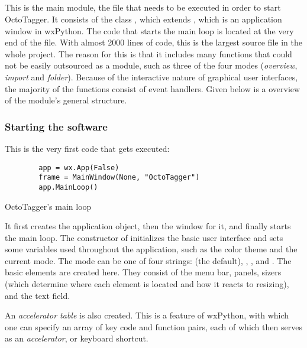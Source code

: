 \subsection{}
\def\kapitelautor{Erik Ritschl}

This is the main module, the file that needs to be executed in order to start OctoTagger. It consists of the class , which extends
, which is an application window in wxPython.
The code that starts the main loop is located at the very end of the file. %
With almost 2000 lines of code, this is the largest source file in the whole
project. The reason for this is that it includes many functions that could not
be easily outsourced as a module, such as three of the four modes (\emph{overview}, \emph{import} and \emph{folder}). Because of the interactive nature of graphical user interfaces, the majority of the  functions consist of event handlers. Given below is a overview of the
module's general structure.

\subsubsection{Starting the software}

This is the very first code that gets executed:

\begin{listing}[H]
    \begin{verbatim}
        app = wx.App(False)
        frame = MainWindow(None, "OctoTagger")
        app.MainLoop()
    \end{verbatim}
    \caption{OctoTagger's main loop}
\end{listing}

It first creates the application object, then the window for it, and finally starts the main loop. The constructor of  initializes the basic user interface and sets some variables
used throughout the application, such as the color theme and the current mode.
The mode can be one of four strings:  (the default),
, , and . The basic elements are created here. They consist of the menu bar, panels,
sizers (which determine where each element is located and how it reacts to
resizing), and the text field. %

An \emph{accelerator table} is also created. This is a feature
of wxPython, with which one can specify an array of key code
and function pairs, each of which then serves as an \emph{accelerator}, or
keyboard shortcut.

